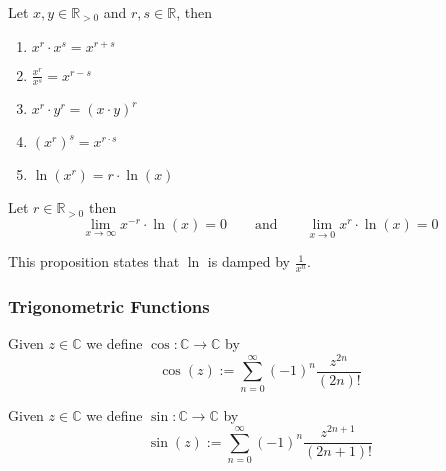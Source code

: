 \begin{proposition}
   Let \(x, y \in \mathbb{R}_{>0}\) and \(r, s \in \mathbb{R}\), then
   \begin{enumerate}[label=\roman*, align=Center]
      \item \(x^r \cdot x^s = x^{r + s}\)
      \item \(\frac{x^r}{x^s} = x^{r-s}\)
      \item \(x^r \cdot y^r = (x \cdot y)^r\)
      \item \((x^r)^s = x^{r \cdot s}\)
      \item \(\ln(x^r) = r \cdot \ln(x)\)
   \end{enumerate}
\end{proposition}

\begin{proposition}
   Let \(r \in \mathbb{R}_{>0}\) then
   \[\lim_{x \to \infty} x^{-r} \cdot \ln(x) = 0 \qquad\text{and}\qquad \lim_{x \to 0} x^r \cdot \ln(x) = 0\]
\end{proposition}
\begin{remark}
   This proposition states that \(\ln\) is damped by \(\frac{1}{x^n}\).
\end{remark}

\subsubsection{Trigonometric Functions}
\begin{definition}[Cosine]
   Given \(z \in \mathbb{C}\) we define \(\cos: \mathbb{C} \to \mathbb{C}\) by
   \[\cos(z) := \sum_{n=0}^\infty (-1)^n \frac{z^{2n}}{(2n)!}\]
\end{definition}

\begin{definition}[Sine]
   Given \(z \in \mathbb{C}\) we define \(\sin: \mathbb{C} \to \mathbb{C}\) by
   \[\sin(z) := \sum_{n=0}^\infty (-1)^n \frac{z^{2n + 1}}{(2n+1)!}\]
\end{definition}

